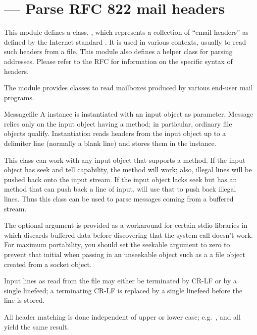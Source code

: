 \section{ ---
         Parse RFC 822 mail headers}


This module defines a class, , which represents a
collection of ``email headers'' as defined by the Internet standard
.  It is used in various contexts, usually to read such
headers from a file.  This module also defines a helper class 
 for parsing  addresses.  Please refer to
the RFC for information on the specific syntax of  headers.

The  module provides classes 
to read mailboxes produced by various end-user mail programs.

\begin{classdesc}{Message}{file}
A  instance is instantiated with an input object as
parameter.  Message relies only on the input object having a
 method; in particular, ordinary file objects
qualify.  Instantiation reads headers from the input object up to a
delimiter line (normally a blank line) and stores them in the
instance.

This class can work with any input object that supports a
 method.  If the input object has seek and tell
capability, the  method will work; also, illegal
lines will be pushed back onto the input stream.  If the input object
lacks seek but has an  method that can push back a
line of input,  will use that to push back illegal
lines.  Thus this class can be used to parse messages coming from a
buffered stream.

The optional  argument is provided as a workaround for
certain stdio libraries in which  discards buffered
data before discovering that the  system call
doesn't work.  For maximum portability, you should set the seekable
argument to zero to prevent that initial  when passing
in an unseekable object such as a a file object created from a socket
object.

Input lines as read from the file may either be terminated by CR-LF or
by a single linefeed; a terminating CR-LF is replaced by a single
linefeed before the line is stored.

All header matching is done independent of upper or lower case;
e.g.\ ,  and
 all yield the same result.
\end{classdesc}

